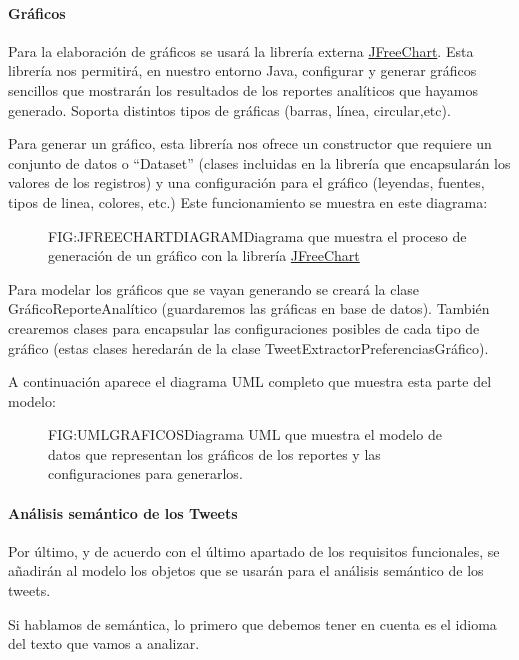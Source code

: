\paragraph{Gráficos}
Para la elaboración de gráficos se usará la librería externa  \href{http://www.jfree.org/jfreechart/}{JFreeChart}. Esta librería nos permitirá, en nuestro entorno Java, configurar y generar gráficos sencillos que mostrarán los resultados de los reportes analíticos que hayamos generado. Soporta distintos tipos de gráficas (barras, línea, circular,etc).

Para generar un gráfico, esta librería nos ofrece un constructor que requiere un conjunto de datos o ``Dataset'' (clases incluidas en la librería que encapsularán los valores de los registros) y una configuración para el gráfico (leyendas, fuentes, tipos de linea, colores, etc.) Este funcionamiento se muestra en este diagrama:

\begin{figure}[Funcionamiento general de JFreeChart]{FIG:JFREECHARTDIAGRAM}{Diagrama que muestra el proceso de generación de un gráfico con la librería \href{http://www.jfree.org/jfreechart/}{JFreeChart}}
\end{figure}

Para modelar los gráficos que se vayan generando se creará la clase GráficoReporteAnalítico (guardaremos las gráficas en base de datos). También crearemos clases para encapsular las configuraciones posibles de cada tipo de gráfico (estas clases heredarán de la clase TweetExtractorPreferenciasGráfico). 

A continuación aparece el diagrama UML completo que muestra esta parte del modelo:

\begin{figure}[Diagrama UML Preferencias Gráficos]{FIG:UMLGRAFICOS}{Diagrama UML que muestra el modelo de datos que representan los gráficos de los reportes y las configuraciones para generarlos.}
\end{figure}

\paragraph{Análisis semántico de los Tweets}
Por último, y de acuerdo con el último apartado de los requisitos funcionales, se añadirán al modelo los objetos que se usarán para el análisis semántico de los tweets. 

Si hablamos de semántica, lo primero que debemos tener en cuenta es el idioma del texto que vamos a analizar. 

